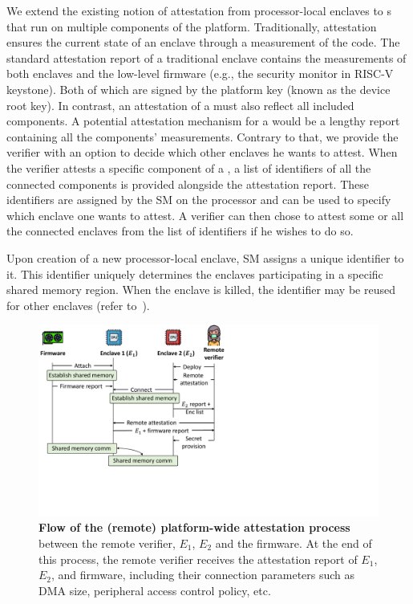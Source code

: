 We extend the existing notion of attestation from processor-local enclaves to \nameenclave{}s that run on multiple components of the platform. Traditionally, attestation ensures the current state of an enclave through a measurement of the code. The standard attestation report of a traditional enclave contains the measurements of both enclaves and the low-level firmware (e.g., the security monitor in RISC-V keystone). Both of which are signed by the platform key (known as the device root key). In contrast, an attestation of a \nameenclave{} must also reflect all included components. 
A potential attestation mechanism for a \nameenclave{} would be a lengthy report containing all the components' measurements. %
Contrary to that, we provide the verifier with an option to decide which other enclaves he wants to attest. When the verifier attests a specific component of a \nameenclave, a list of identifiers of all the connected components is provided alongside the attestation report. These identifiers are assigned by the SM on the processor and can be used to specify which enclave one wants to attest. A verifier can then chose to attest some or all the connected enclaves from the list of identifiers if he wishes to do so.


Upon creation of a new processor-local enclave, SM assigns a unique identifier to it. This identifier uniquely determines the enclaves participating in a specific shared memory region. When the enclave is killed, the identifier may be reused for other enclaves (refer to~).


\begin{figure}[t]
  \centering
  \includegraphics[trim={0 5cm 15cm 0}, clip, width=.8\linewidth]{chapters/PIE/images/localAttestation.pdf}
  \caption[Flow of (remote) platform-wide attestation process between \nameenclave{}'s components]{\textbf{Flow of the (remote) platform-wide attestation process} between the remote verifier, $E_1$, $E_2$ and the \sphw firmware. At the end of this process, the remote verifier receives the attestation report of $E_1$, $E_2$, and \sphw firmware, including their connection parameters such as DMA size, peripheral access control policy, etc.}   
  \label{fig:attestationFlow}
\end{figure}

